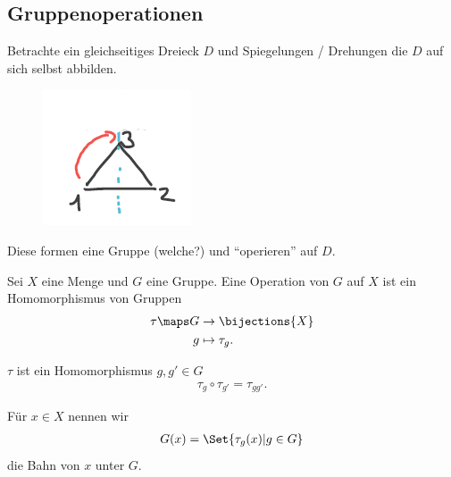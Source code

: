 \subsection*{Gruppenoperationen}
\begin{beispiel}\label{d_3}
    Betrachte ein gleichseitiges Dreieck \( D \) und Spiegelungen / Drehungen die \( D \) auf sich selbst abbilden.

    \begin{figure}[H]
        \centering
        \includegraphics[width=0.2\linewidth]{figures/d_3}
        \label{fig:d_3}
    \end{figure}
    Diese formen eine Gruppe (welche?) und \enquote{operieren} auf \( D \).
\end{beispiel}
\begin{definition}
    Sei \( X \) eine Menge und \( G \) eine Gruppe. 
    Eine Operation von \( G \) auf \( X \) ist ein Homomorphismus von Gruppen
    \begin{align*}
        \tau\maps \begin{aligned}[t] 
            G&\to \bijections{X}\\
            g&\mapsto \tau_g.
        \end{aligned}
    \end{align*}
\end{definition}
\begin{bemerkung*}
    \( \tau \) ist ein Homomorphismus \dh \tforall \( g, g' \in G \)
    \begin{align*}
        \tau_g\circ \tau_{g'}=\tau_{gg'}.
    \end{align*}
    
    Für \( x\in X \) nennen wir
    \begin{align*}
        G(x)=\Set{\tau_g(x)|g\in G}
    \end{align*}
    die Bahn von \( x \) unter \( G \).
\end{bemerkung*}
